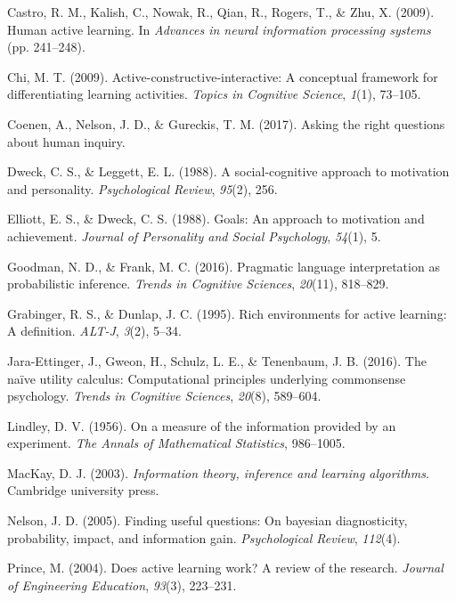 \documentclass[10pt, letterpaper]{article}
\begin{document}
\hypertarget{refs}{}
\hypertarget{ref-castro2009human}{}
Castro, R. M., Kalish, C., Nowak, R., Qian, R., Rogers, T., \& Zhu, X.
(2009). Human active learning. In \emph{Advances in neural information
processing systems} (pp. 241--248).

\hypertarget{ref-chi2009active}{}
Chi, M. T. (2009). Active-constructive-interactive: A conceptual
framework for differentiating learning activities. \emph{Topics in
Cognitive Science}, \emph{1}(1), 73--105.

\hypertarget{ref-coenen2017}{}
Coenen, A., Nelson, J. D., \& Gureckis, T. M. (2017). Asking the right
questions about human inquiry.

\hypertarget{ref-dweck1988}{}
Dweck, C. S., \& Leggett, E. L. (1988). A social-cognitive approach to
motivation and personality. \emph{Psychological Review}, \emph{95}(2),
256.

\hypertarget{ref-elliott1988}{}
Elliott, E. S., \& Dweck, C. S. (1988). Goals: An approach to motivation
and achievement. \emph{Journal of Personality and Social Psychology},
\emph{54}(1), 5.

\hypertarget{ref-goodman2016}{}
Goodman, N. D., \& Frank, M. C. (2016). Pragmatic language
interpretation as probabilistic inference. \emph{Trends in Cognitive
Sciences}, \emph{20}(11), 818--829.

\hypertarget{ref-grabinger1995rich}{}
Grabinger, R. S., \& Dunlap, J. C. (1995). Rich environments for active
learning: A definition. \emph{ALT-J}, \emph{3}(2), 5--34.

\hypertarget{ref-jara2016}{}
Jara-Ettinger, J., Gweon, H., Schulz, L. E., \& Tenenbaum, J. B. (2016).
The naïve utility calculus: Computational principles underlying
commonsense psychology. \emph{Trends in Cognitive Sciences},
\emph{20}(8), 589--604.

\hypertarget{ref-lindley1956}{}
Lindley, D. V. (1956). On a measure of the information provided by an
experiment. \emph{The Annals of Mathematical Statistics}, 986--1005.

\hypertarget{ref-mackay2003}{}
MacKay, D. J. (2003). \emph{Information theory, inference and learning
algorithms}. Cambridge university press.

\hypertarget{ref-nelson2005}{}
Nelson, J. D. (2005). Finding useful questions: On bayesian
diagnosticity, probability, impact, and information gain.
\emph{Psychological Review}, \emph{112}(4).

\hypertarget{ref-prince2004does}{}
Prince, M. (2004). Does active learning work? A review of the research.
\emph{Journal of Engineering Education}, \emph{93}(3), 223--231.
\end{document}
